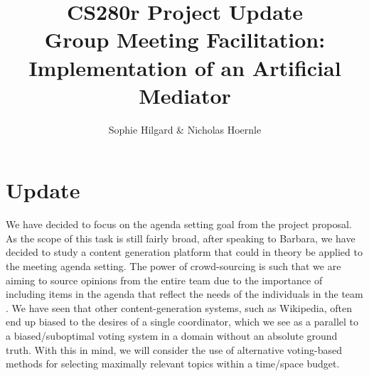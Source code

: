 \documentclass[final,authoryear,11pt,times]{elsarticle}
\begin{document}
\begin{frontmatter}

\title{CS280r Project Update \\ Group Meeting Facilitation: Implementation of an Artificial Mediator}


\author{Sophie Hilgard \& Nicholas Hoernle}


\end{frontmatter}

\section{Update}
We have decided to focus on the agenda setting goal from the project proposal. As the scope of this task is still fairly broad, after speaking to Barbara, we have decided to study a content generation platform that could in theory be applied to the meeting agenda setting. The power of crowd-sourcing is such that we are aiming to source opinions from the entire team due to the importance of including items in the agenda that reflect the needs of the individuals in the team \citep{schwartz2015design}. We have seen that other content-generation systems, such as Wikipedia, often end up biased to the desires of a single coordinator, which we see as a parallel to a biased/suboptimal voting system in a domain without an absolute ground truth. With this in mind, we will consider the use of alternative voting-based methods for selecting maximally relevant topics within a time/space budget.
\end{document}
